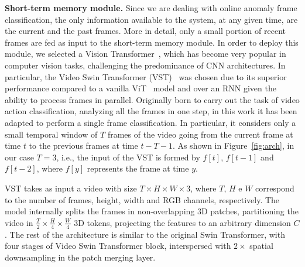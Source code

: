 \noindent\textbf{Short-term memory module.}
Since we are dealing with online anomaly frame classification, the only information available to the system, at any given time, are the current and the past frames.
More in detail, only a small portion of recent frames are fed as input to the short-term memory module.
In order to deploy this module, we selected a Vision Transformer~\cite{DBLP:conf/iclr/DosovitskiyB0WZ21}, which has become very popular in computer vision tasks, challenging the predominance of CNN architectures. 
In particular, the Video Swin Transformer (VST)~\cite{liu_video_2022} was chosen due to its superior performance compared to a vanilla ViT~\cite{DBLP:conf/iclr/DosovitskiyB0WZ21} model
and over an RNN given the ability to process frames in parallel.
Originally born to carry out the task of video action classification, analyzing all the frames in one step, in this work it has been adapted to perform a single frame classification.
In particular, it considers only a small temporal window of $T$ frames of the video going from the current frame at time $t$ to the previous frames at time $t-T-1$.
As shown in Figure~\ref{fig:arch}, in our case $T=3$, i.e., the input of the VST is formed by $f[t]$, $f[t-1]$ and $f[t-2]$, where $f[y]$ represents the frame at time $y$.

VST takes as input a video with size $T \times H \times W \times 3$, where $T$, $H$ e $W$ correspond to the number of frames, height, width and RGB channels, respectively.
The model internally splits the frames in non-overlapping 3D patches, partitioning the video in $\frac{T}{2} \times \frac{H}{4} \times \frac{W}{4}$ 3D tokens, projecting the features to an arbitrary dimension $C$.
The rest of the architecture is similar to the original Swin Transformer, with four stages of Video Swin Transformer block, 
interspersed with $2\times$ spatial downsampling in the patch merging layer.

